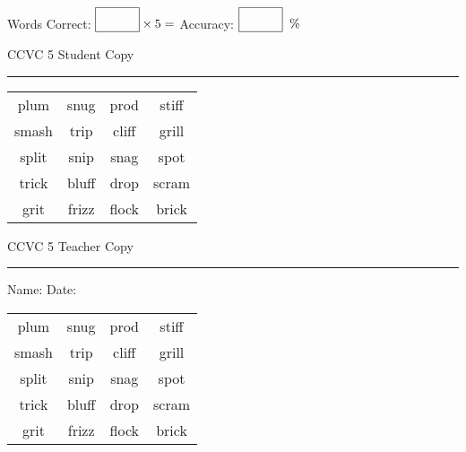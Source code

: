 \documentclass{memoir}
\begin{document}
\small

Words Correct: $\fbox{\phantom{\huge 100}} \times 5 = $ Accuracy: $\fbox{\phantom{\huge 100}}\;\; \%$ 

\vfill

\newpage


\footnotesize \noindent
CCVC 5 \hfill Student Copy
\smallskip
\hrule

\Large

\setlength{\tabcolsep}{14pt}
\def\arraystretch{3}

{\selectfont


\begin{vplace}[0.5]
\begin{center}
\begin{tabular}{cccc}
plum & snug & prod & stiff \\
smash & trip & cliff            & grill            \\
split & snip & snag & spot \\
trick & bluff & drop & scram \\
grit      & frizz & flock & brick       \\
\end{tabular}
\end{center}
\end{vplace}

}

\newpage

\footnotesize \noindent
CCVC 5 \hfill Teacher Copy
\smallskip
\hrule

\small

\vfill

\noindent
Name: \underline{\hspace{1.75in}} \hfill Date: \underline{\hspace{1in}}

\Large

{\selectfont


\begin{vplace}[0.5]
\begin{center}
\begin{tabular}{cccc}
plum & snug & prod & stiff \\
smash & trip & cliff            & grill            \\
split & snip & snag & spot \\
trick & bluff & drop & scram \\
grit      & frizz & flock & brick       \\
\end{tabular}
\end{center}
\end{vplace}



}
\end{document}

